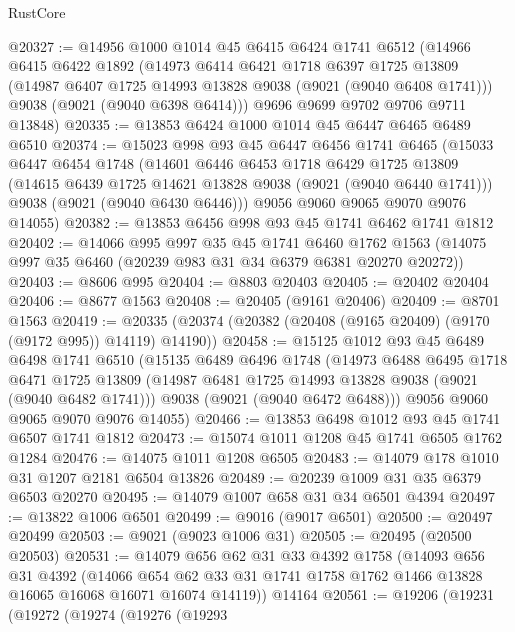 \begin{lexlean}{RustCore}
\begin{coremodule}
@20327 := @14956
    @1000
    @1014
    @45
    @6415
    @6424
    @1741
    @6512
    (@14966
      @6415
      @6422
      @1892
      (@14973
        @6414
        @6421
        @1718
        @6397
        @1725
        @13809
        (@14987 @6407 @1725 @14993 @13828 @9038 (@9021 (@9040 @6408 @1741)))
        @9038
        (@9021 (@9040 @6398 @6414)))
      @9696
      @9699
      @9702
      @9706
      @9711
      @13848)
@20335 := @13853 @6424 @1000 @1014 @45 @6447 @6465 @6489 @6510
@20374 := @15023
    @998
    @93
    @45
    @6447
    @6456
    @1741
    @6465
    (@15033
      @6447
      @6454
      @1748
      (@14601
        @6446
        @6453
        @1718
        @6429
        @1725
        @13809
        (@14615 @6439 @1725 @14621 @13828 @9038 (@9021 (@9040 @6440 @1741)))
        @9038
        (@9021 (@9040 @6430 @6446)))
      @9056
      @9060
      @9065
      @9070
      @9076
      @14055)
@20382 := @13853 @6456 @998 @93 @45 @1741 @6462 @1741 @1812
@20402 := @14066
    @995
    @997
    @35
    @45
    @1741
    @6460
    @1762
    @1563
    (@14075 @997 @35 @6460 (@20239 @983 @31 @34 @6379 @6381 @20270 @20272))
@20403 := @8606 @995
@20404 := @8803 @20403
@20405 := @20402 @20404
@20406 := @8677 @1563
@20408 := @20405 (@9161 @20406)
@20409 := @8701 @1563
@20419 := @20335 (@20374 (@20382 (@20408 (@9165 @20409) (@9170 (@9172 @995)) @14119) @14190))
@20458 := @15125
    @1012
    @93
    @45
    @6489
    @6498
    @1741
    @6510
    (@15135
      @6489
      @6496
      @1748
      (@14973
        @6488
        @6495
        @1718
        @6471
        @1725
        @13809
        (@14987 @6481 @1725 @14993 @13828 @9038 (@9021 (@9040 @6482 @1741)))
        @9038
        (@9021 (@9040 @6472 @6488)))
      @9056
      @9060
      @9065
      @9070
      @9076
      @14055)
@20466 := @13853 @6498 @1012 @93 @45 @1741 @6507 @1741 @1812
@20473 := @15074 @1011 @1208 @45 @1741 @6505 @1762 @1284
@20476 := @14075 @1011 @1208 @6505
@20483 := @14079 @178 @1010 @31 @1207 @2181 @6504 @13826
@20489 := @20239 @1009 @31 @35 @6379 @6503 @20270
@20495 := @14079 @1007 @658 @31 @34 @6501 @4394
@20497 := @13822 @1006 @6501
@20499 := @9016 (@9017 @6501)
@20500 := @20497 @20499
@20503 := @9021 (@9023 @1006 @31)
@20505 := @20495 (@20500 @20503)
@20531 := @14079
    @656
    @62
    @31
    @33
    @4392
    @1758
    (@14093
      @656
      @31
      @4392
      (@14066 @654 @62 @33 @31 @1741 @1758 @1762 @1466 @13828 @16065 @16068 @16071 @16074 @14119))
    @14164
@20561 := @19206
    (@19231
      (@19272
        (@19274
          (@19276
            (@19293

\end{coremodule}
\end{lexlean}

